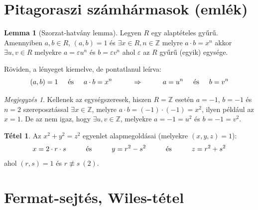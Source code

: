 \documentclass[12pt]{book}
\theoremstyle{plain} %
\theoremstyle{definition} %
\newtheorem{lem/}{Lemma}[section]
\newenvironment{lem}
  {\renewcommand{\qedsymbol}{$\clubsuit$}%
   \pushQED{\qed}\begin{lem/}}
  {\popQED\end{lem/}}
\newtheorem{theo/}{Tétel}[section]
\newenvironment{theo}
  {\renewcommand{\qedsymbol}{$\clubsuit$}%
   \pushQED{\qed}\begin{theo/}}
  {\popQED\end{theo/}}
\theoremstyle{remark}
\newtheorem*{mj}{Megjegyzés}
\renewcommand\qedsymbol{$\blacksquare$}
\numberwithin{equation}{section}  %
\def\Z{\mathbb{Z}}
\begin{document}
	
	\section{Pitagoraszi számhármasok (emlék)}
	
	\begin{lem}[Szorzat-hatvány lemma]\label{szhl}
		Legyen $R$ egy alaptételes gyűrű. Amennyiben $a,b\in R$, $(a,b)=1$ és $\exists x\in R, n\in \Z$ melyre $a\cdot b = x^n$ akkor $\exists u,v\in R$ melyekre $a = \varepsilon u^n$ és $b = \varepsilon v^n$ ahol $\varepsilon$ az $R$ gyűrű (egyik) egysége.
	\end{lem}

	Röviden, a lényeget kiemelve, de pontatlanul leírva:
	\[ (a,b)=1 \hspace{5mm} \text{és} \hspace{5mm} a\cdot b = x^n \hspace{10mm} \Rightarrow \hspace{10mm} a = u^n \hspace{5mm} \text{és} \hspace{5mm} b = v^n  \]
	
	\begin{mj}
		Kellenek az egységszeresek, hiszen $R=\Z$ esetén $a=-1$, $b=-1$ és $n=2$ szereposztással $\exists x\in \Z$, melyre $a\cdot b = (-1)\cdot (-1) = x^2$, ilyen például az $x=1$. De az nem igaz, hogy $\exists u,v\in \Z$, melyekre $a=-1=u^2$ és $b=-1=v^2$.
	\end{mj}
	
	\begin{theo}
		Az $x^2+y^2=z^2$ egyenlet alapmegoldásai (melyekre $(x,y,z)=1$):
		\[ x=2\cdot r \cdot s \hspace{10mm} \text{és} \hspace{10mm} y=r^2-s^2 \hspace{10mm} \text{és} \hspace{10mm} z = r^2 + s^2 \]
		ahol $(r,s)=1$ és $r\not \equiv s\ (2)$.
	\end{theo}
	
	\section{Fermat-sejtés, Wiles-tétel}
	
\end{document}
